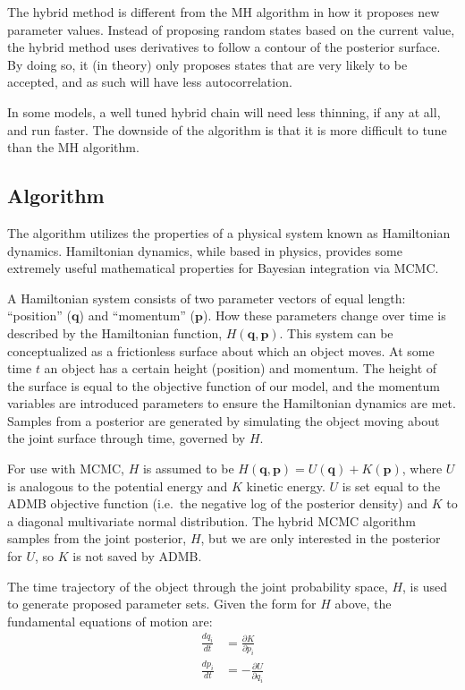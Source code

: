 \documentclass{article}\usepackage[]{graphicx}\usepackage[]{color}
\begin{document}
The hybrid method is different from the MH algorithm in how
it proposes new parameter values. Instead of proposing
random states based on the current value, the hybrid method
uses derivatives to follow a contour of the posterior
surface. By doing so, it (in theory) only proposes states
that are very likely to be accepted, and as such will have
less autocorrelation.

In some models, a well tuned hybrid chain will need less
thinning, if any at all, and run faster. The downside of the
algorithm is that it is more difficult to tune than the MH
algorithm.

\subsection{Algorithm}
The algorithm utilizes the properties of a physical system
known as Hamiltonian dynamics. Hamiltonian dynamics, while
based in physics, provides some extremely useful
mathematical properties for Bayesian integration via MCMC.

A Hamiltonian system consists of two parameter vectors of
equal length: ``position'' ($\mathbf{q}$) and ``momentum''
($\mathbf{p}$). How these parameters change over time is
described by the Hamiltonian function,
$H(\mathbf{q},\mathbf{p})$. This system can be
conceptualized as a frictionless surface about which an
object moves. At some time $t$ an object has a certain
height (position) and momentum. The height of the surface is
equal to the objective function of our model, and the
momentum variables are introduced parameters to ensure the
Hamiltonian dynamics are met. Samples from a posterior are
generated by simulating the object moving about the joint
surface through time, governed by $H$.

For use with MCMC, $H$ is assumed to be
$H(\mathbf{q},\mathbf{p})=U(\mathbf{q})+K(\mathbf{p})$,
where $U$ is analogous to the potential energy and $K$
kinetic energy. $U$ is set equal to the ADMB objective
function (i.e.\ the negative log of the posterior density)
and $K$ to a diagonal multivariate normal distribution. The
hybrid MCMC algorithm samples from the joint posterior, $H$,
but we are only interested in the posterior for $U$, so $K$
is not saved by ADMB.

The time trajectory of the object through the joint
probability space, $H$, is used to generate proposed
parameter sets. Given the form for $H$ above, the
fundamental equations of motion are:
\begin{align}
  \label{eq:motion}
  \frac{dq_i}{dt} &= \frac{\partial{K}}{\partial{p_i}}\\
  \frac{dp_i}{dt} &= -\frac{\partial{U}}{\partial{q_i}}
\end{align}
\end{document}
